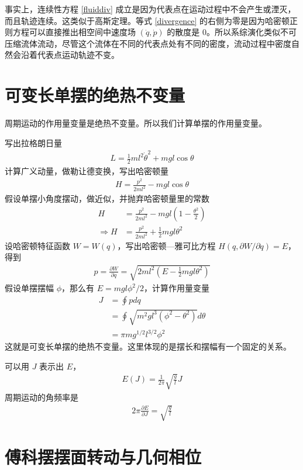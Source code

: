 \documentclass[12pt,a4paper,UTF8]{ctexart}
\begin{document}
事实上，连续性方程 \ref{fluiddiv} 成立是因为代表点在运动过程中不会产生或湮灭，而且轨迹连续。这类似于高斯定理。等式 \ref{divergence} 的右侧为零是因为哈密顿正则方程可以直接推出相空间中速度场 $(\dot q,\dot p)$ 的散度是 0。所以系综演化类似不可压缩流体流动，尽管这个流体在不同的代表点处有不同的密度，流动过程中密度自然会沿着代表点运动轨迹不变。

\section{可变长单摆的绝热不变量}

周期运动的作用量变量是绝热不变量。所以我们计算单摆的作用量变量。

写出拉格朗日量
\begin{align}
    L = \frac{1}{2}ml^2\dot\theta^2 + mgl\cos\theta
\end{align}
计算广义动量，做勒让德变换，写出哈密顿量
\begin{align}
    H = \frac{p^2}{2ml^2} - mgl\cos\theta
\end{align}
假设单摆小角度摆动，做近似，并抛弃哈密顿量里的常数
\begin{align}
    H &= \frac{p^2}{2ml^2} - mgl(1 - \frac{\theta^2}{2}) \\
    \Longrightarrow
    H &= \frac{p^2}{2ml^2} + \frac{1}{2}mgl\theta^2
\end{align}
设哈密顿特征函数 $W = W(q)$，写出哈密顿—雅可比方程 $H(q,\partial W/\partial q) = E$，得到
\begin{align}
    p = \frac{\partial W}{\partial q} = \sqrt{2ml^2(E - \frac{1}{2}mgl\theta^2)}
\end{align}
假设单摆摆幅 $\phi$，那么有 $E = mgl\phi^2/2$，计算作用量变量
\begin{align}
    J &= \oint pdq \\
    &= \oint \sqrt{m^2gl^3(\phi^2 - \theta^2)}d\theta \\
    &= \pi mg^{1/2}l^{3/2}\phi^2
\end{align}
这就是可变长单摆的绝热不变量。这里体现的是摆长和摆幅有一个固定的关系。

可以用 $J$ 表示出 $E$，
\begin{align}
    E(J) = \frac{1}{2\pi}\sqrt{\frac{g}{l}}J
\end{align}
周期运动的角频率是
\begin{align}
    2\pi\frac{\partial E}{\partial J} = \sqrt{\frac{g}{l}}
\end{align}

\section{傅科摆摆面转动与几何相位}
\end{document}
